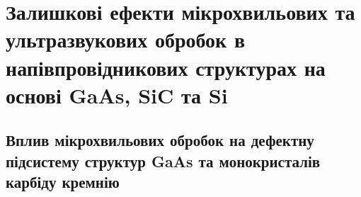 \documentclass[a4paper,14pt,oneside,openany]{memoir}
\begin{document}







%














%

\chapter{Залишкові ефекти мікрохвильових та ультразвукових обробок в напівпровідникових структурах на основі GaAs, SiC та Si\label{Ch_UST_MW}}

\section{Вплив мікрохвильових обробок на дефектну підсистему структур GaAs та монокристалів карбіду кремнію}
\end{document}
